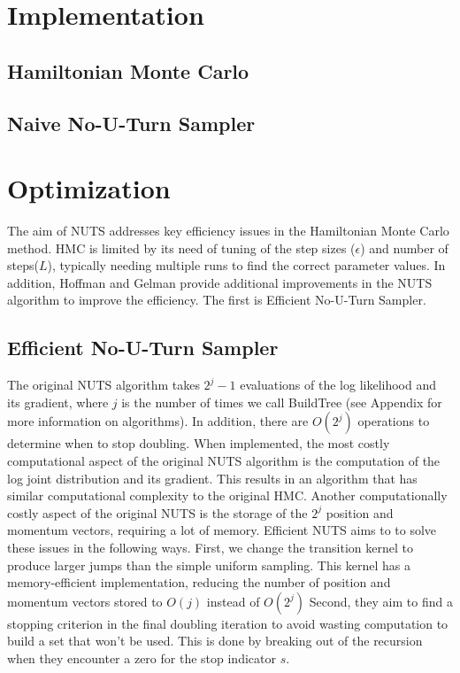\documentclass[12pt]{article}
\begin{document}
\section{Implementation}
\subsection{Hamiltonian Monte Carlo}
\subsection{Naive No-U-Turn Sampler}

\section{Optimization}
The aim of NUTS addresses key efficiency issues in the Hamiltonian Monte Carlo method. HMC is limited by its need of tuning of the step sizes ($\epsilon$) and number of steps($L$), typically needing multiple runs to find the correct parameter values. In addition, Hoffman and Gelman provide additional improvements in the NUTS algorithm to improve the efficiency. The first is Efficient No-U-Turn Sampler.
\subsection{Efficient No-U-Turn Sampler}
The original NUTS algorithm takes $2^j -1$ evaluations of the log likelihood and its gradient, where $j$ is the number of times we call BuildTree (see Appendix for more information on algorithms). In addition, there are $O(2^j)$ operations to determine when to stop doubling. When implemented, the most costly computational aspect of the original NUTS algorithm is the computation of the log joint distribution and its gradient. This results in an algorithm that has similar computational complexity to the original HMC. Another computationally costly aspect of the original NUTS is the storage of the $2^j$ position and momentum vectors, requiring a lot of memory.  Efficient NUTS aims to to solve these issues in the following ways. First, we change the transition kernel to produce larger jumps than the simple uniform sampling. This kernel has a memory-efficient implementation, reducing the number of position and momentum vectors stored to $O(j)$ instead of $O(2^j)$ Second, they aim to find a stopping criterion in the final doubling iteration to avoid wasting computation to build a set that won't be used. This is done by breaking out of the recursion when they encounter a zero for the stop indicator $s$.
  
\end{document}
